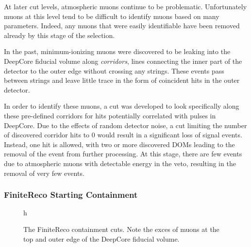 At later cut levels, atmospheric muons continue to be problematic.
Unfortunately muons at this level tend to be difficult to identify muons based on many parameters.
Indeed, any muons that were easily identifiable have been removed already by this stage of the selection.

In the past, minimum-ionizing muons were discovered to be leaking into the DeepCore fiducial volume along \emph{corridors}, lines connecting the inner part of the detector to the outer edge without crossing any strings.
These events pass between strings and leave little trace in the form of coincident hits in the outer detector.

In order to identify these muons, a cut was developed to look specifically along these pre-defined corridors for hits potentially correlated with pulses in DeepCore.
Due to the effects of random detector noise, a cut limiting the number of discovered corridor hits to 0 would result in a significant loss of signal events.
Instead, one hit is allowed, with two or more discovered DOMs leading to the removal of the event from further processing.
At this stage, there are few events due to atmospheric muons with detectable energy in the veto, resulting in the removal of very few events.



\subsubsection{FiniteReco Starting Containment}
\begin{figure}{h}%
	\centering
	\caption[The FiniteReco Containment Cuts]{The FiniteReco containment cuts. Note the exces of muons at the top and outer edge of the DeepCore fiducial volume.}%
	\label{fig:finitereco_cuts}%
\end{figure}

